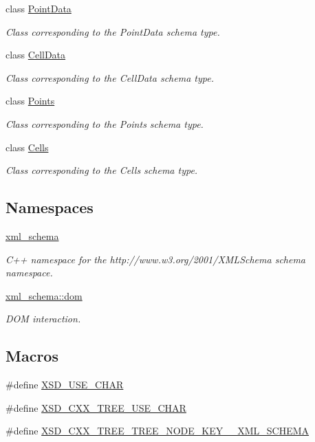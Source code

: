 \begin{DoxyCompactItemize}
class \hyperlink{classPointData}{Point\+Data}
\begin{DoxyCompactList}\small\item\em Class corresponding to the Point\+Data schema type. \end{DoxyCompactList}\item 
class \hyperlink{classCellData}{Cell\+Data}
\begin{DoxyCompactList}\small\item\em Class corresponding to the Cell\+Data schema type. \end{DoxyCompactList}\item 
class \hyperlink{classPoints}{Points}
\begin{DoxyCompactList}\small\item\em Class corresponding to the Points schema type. \end{DoxyCompactList}\item 
class \hyperlink{classCells}{Cells}
\begin{DoxyCompactList}\small\item\em Class corresponding to the Cells schema type. \end{DoxyCompactList}\end{DoxyCompactItemize}
\subsection*{Namespaces}
\begin{DoxyCompactItemize}
\item 
 \hyperlink{namespacexml__schema}{xml\+\_\+schema}
\begin{DoxyCompactList}\small\item\em C++ namespace for the http\+://www.w3.\+org/2001/\+X\+M\+L\+Schema schema namespace. \end{DoxyCompactList}\item 
 \hyperlink{namespacexml__schema_1_1dom}{xml\+\_\+schema\+::dom}
\begin{DoxyCompactList}\small\item\em D\+O\+M interaction. \end{DoxyCompactList}\end{DoxyCompactItemize}
\subsection*{Macros}
\begin{DoxyCompactItemize}
\item 
\#define \hyperlink{vtk-unstructured_8h_aee0a950eb1ff2461391d858c0cd254b7}{X\+S\+D\+\_\+\+U\+S\+E\+\_\+\+C\+H\+A\+R}
\item 
\#define \hyperlink{vtk-unstructured_8h_acef724a52414642ad3c9b7209702daf5}{X\+S\+D\+\_\+\+C\+X\+X\+\_\+\+T\+R\+E\+E\+\_\+\+U\+S\+E\+\_\+\+C\+H\+A\+R}
\item 
\#define \hyperlink{vtk-unstructured_8h_ab727c6f10de580ac0bb8f7395fa68895}{X\+S\+D\+\_\+\+C\+X\+X\+\_\+\+T\+R\+E\+E\+\_\+\+T\+R\+E\+E\+\_\+\+N\+O\+D\+E\+\_\+\+K\+E\+Y\+\_\+\+\_\+\+X\+M\+L\+\_\+\+S\+C\+H\+E\+M\+A}
\end{DoxyCompactItemize}
